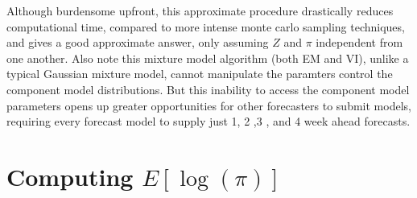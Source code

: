\documentclass[sagev,times,Review,10pt]{sagej}
\begin{document}
\begin{appendix}
Although burdensome upfront, this approximate procedure drastically reduces computational time, compared to more intense monte carlo sampling techniques, and gives a good approximate answer, only assuming $Z$ and $\pi$ independent from one another.
Also note this mixture model algorithm (both EM and VI), unlike a typical Gaussian mixture model, cannot manipulate the paramters control the component model distributions.
But this inability to access the component model parameters opens up greater opportunities for other forecasters to submit models, requiring every forecast model to supply just 1, 2 ,3 , and 4 week ahead forecasts.

\section{Computing $E[\log(\pi)]$}
\label{app.expec}


\end{appendix}
\end{document}

